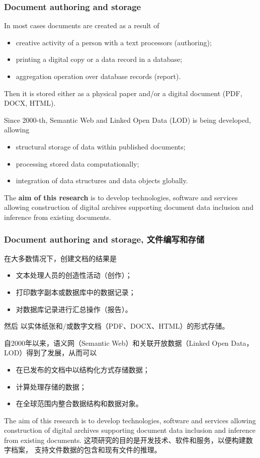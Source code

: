 \documentclass[10pt]{beamer}
\begin{document}
\begin{frame}
  \frametitle{Document authoring and storage}
  In most cases documents are created as a result of
  \begin{itemize}
  \item creative activity of a person with a text processors (authoring);
  \item printing a digital copy or a data record in a database;
  \item aggregation operation over database records (report).
  \end{itemize}
  Then it is stored either as a physical paper and/or a digital document (PDF, DOCX, HTML).

  Since 2000-th, Semantic Web and Linked Open Data (LOD) is being developed, allowing
  \begin{itemize}
  \item structural storage of data within published documents;
  \item processing stored data computationally;
  \item integration of data structures and data objects globally.
  \end{itemize}

  The \textbf{aim of this research} is to develop technologies, software and services allowing construction of digital archives supporting document data inclusion and inference from existing documents.
\end{frame}

\begin{frame}
  \frametitle{Document authoring and storage, 文件编写和存储}
  在大多数情况下，创建文档的结果是
  \begin{itemize}
  \item
文本处理人员的创造性活动（创作）；
  \item
    打印数字副本或数据库中的数据记录；
  \item
        对数据库记录进行汇总操作（报告）。
  \end{itemize}
然后 以实体纸张和/或数字文档（PDF、DOCX、HTML）的形式存储。

  自2000年以来，语义网（Semantic Web）和关联开放数据（Linked Open Data，LOD）得到了发展，从而可以
  \begin{itemize}
  \item
    在已发布的文档中以结构化方式存储数据；
  \item
 计算处理存储的数据；
  \item
        在全球范围内整合数据结构和数据对象。
  \end{itemize}

  The aim of this research is to develop technologies, software and services allowing construction of digital archives supporting document data inclusion and inference from existing documents.
  这项研究的目的是开发技术、软件和服务，以便构建数字档案，
  支持文件数据的包含和现有文件的推理。
\end{frame}
\end{document}
